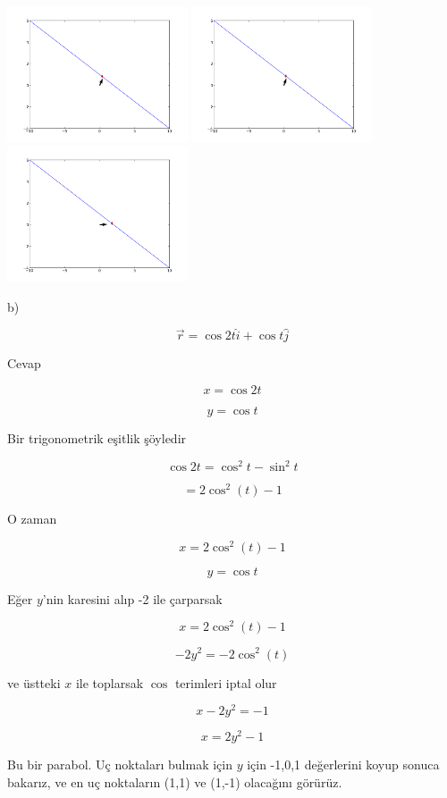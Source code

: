\documentclass[12pt,fleqn]{article}\usepackage{../../common}
\begin{document}
\includegraphics[height=4cm]{1i3_20.png}
\includegraphics[height=4cm]{1i3_24.png}
\includegraphics[height=4cm]{1i3_28.png}

b) 

$$ \vec{r} = \cos 2t \hat{i} + \cos t \hat{j}  $$

Cevap

$$ x = \cos 2t $$

$$ y = \cos t $$

Bir trigonometrik eşitlik şöyledir

$$ \cos 2t = \cos^2 t - \sin^2t  $$

$$ = 2 \cos^2(t) - 1 $$

O zaman

$$ x = 2 \cos^2(t) - 1  $$

$$ y = \cos t $$

Eğer $y$'nin karesini alıp -2 ile çarparsak

$$ x = 2\cos^2(t) - 1  $$

$$ -2y^2 = -2\cos^2(t) $$

ve üstteki $x$ ile toplarsak $\cos$ terimleri iptal olur

$$ x-2y^2 = -1 $$

$$ x = 2y^2 -1 $$

Bu bir parabol. Uç noktaları bulmak için $y$ için -1,0,1 değerlerini koyup
sonuca bakarız, ve en uç noktaların (1,1) ve (1,-1) olacağını görürüz. 
\end{document}
